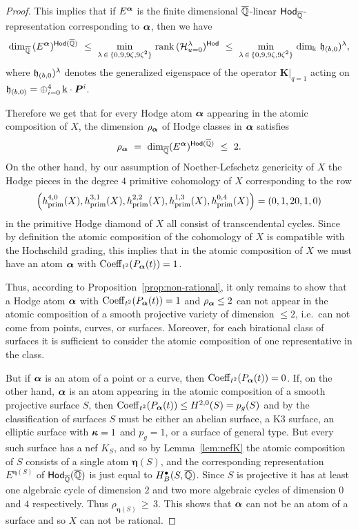 \documentclass[twoside,leqno]{article}
\numberwithin{equation}{section}
\theoremstyle{plain}
\theoremstyle{definition}
\begin{document}
\begin{proof}
This implies that if $E^{\boldsymbol{\alpha}}$ is the finite dimensional $\overline{\mathbb Q}$-linear $\mathsf{Hod}_{\overline{\mathbb Q}}$-representation 
corresponding to $\boldsymbol{\alpha}$, then we have
\[
\dim_{\overline{\mathbb Q}} \, (E^{\boldsymbol{\alpha}})^{\mathsf{Hod}(\overline{\mathbb Q})} \ \leq \ \min_{\substack{\lambda \, \in \, \{0,9,9\zeta,9\zeta^2\}}} \, \operatorname{rank} \, (\mathcal H^{\lambda}_{u=0})^{\mathsf{Hod}} \ \leq \  \min_{\substack{\lambda \, \in \, \{0,9,9\zeta,9\zeta^2\}}} \,  
\dim_{\Bbbk} \,  \mathfrak{h}_{(b,0})^{\lambda},
\]
where $\mathfrak{h}_{(b,0})^{\lambda}$ denotes the generalized eigenspace of the operator $\mathbf{K}|_{q=1}$ acting on $\mathfrak{h}_{(b,0)} = \oplus_{i = 0}^4 \, \Bbbk\cdot \boldsymbol{P}^{i}$.

Therefore we get that for 
every Hodge atom $\boldsymbol{\alpha}$ appearing in the atomic composition of $X$, the dimension $\rho_{\boldsymbol{\alpha}}$ of Hodge classes in $\boldsymbol{\alpha}$ satisfies 
\[
\rho_{\boldsymbol{\alpha}} \ = \ \dim_{\overline{\mathbb Q}} (E^{\boldsymbol{\alpha}})^{\mathsf{Hod}(\overline{\mathbb Q})} \ \leq  \ 2.
\]
On the other hand, by our  assumption of Noether-Lefschetz genericity of $X$ the Hodge pieces  in the degree $4$ primitive cohomology of $X$ corresponding to the row 
\[
\left(h^{4,0}_{\operatorname{prim}}(X),h^{3,1}_{\operatorname{prim}}(X), h^{2,2}_{\operatorname{prim}}(X),h^{1,3}_{\operatorname{prim}}(X),h^{0,4}_{\operatorname{prim}}(X)\right) = (0,1, 20, 1,0)
\]
in the primitive Hodge diamond of $X$ all  consist of transcendental cycles. Since by definition the atomic composition of the cohomology of $X$ is compatible with the Hochschild grading, this implies that in 
the atomic composition of $X$ we must have an atom $\boldsymbol{\alpha}$ with $\operatorname{Coeff}_{t^2}(P_{\boldsymbol{\alpha}}(t)) = 1$. 

Thus, according to Proposition~\ref{prop:non-rational}, it only remains to show that a Hodge atom $\boldsymbol{\alpha}$ with $\operatorname{Coeff}_{t^2}(P_{\boldsymbol{\alpha}}(t)) = 1$ and $\rho_{\boldsymbol{\alpha}} \leq 2$ can not appear in the atomic composition of a smooth projective variety of dimension $\leq 2$, i.e.\ can not come from points, curves, or surfaces.
Moreover, for each birational class of surfaces it is sufficient to consider the atomic composition of one representative in the class.


But if $\boldsymbol{\alpha}$ is an atom of a point or a curve, then $\operatorname{Coeff}_{t^2}(P_{\boldsymbol{\alpha}}(t)) = 0$. If, on the other hand, $\boldsymbol{\alpha}$ is an atom appearing in the atomic composition of a smooth projective surface $S$, then $\operatorname{Coeff}_{t^2}(P_{\boldsymbol{\alpha}}(t)) \leq  H^{2,0}(S) = p_{g}(S)$ and by the classification of surfaces  
$S$ must be either an abelian surface, a K3 surface, an elliptic surface with $\boldsymbol{\kappa} =1$ and $p_{g} =1$, or a surface of general type. But every such surface has a nef $K_{S}$, and so by Lemma~\ref{lem:nefK} the atomic composition of $S$ consists of a single atom $\boldsymbol{\eta}(S)$, and the corresponding representation 
$E^{\boldsymbol{\eta}(S)}$ of $\mathsf{Hod}_{\overline{\mathbb Q}}(\overline{\mathbb Q})$ is just equal to 
$H^{\bullet}_{B}(S,\overline{\mathbb Q})$. Since $S$ is projective it has at least one algebraic cycle of dimension $2$ and two more algebraic cycles of dimension $0$ and $4$ respectively.
Thus $\rho_{\boldsymbol{\eta}(S)} \, \geq \, 3$. This shows that $\boldsymbol{\alpha}$ can not be an atom of a surface and so $X$ can not be rational.
\end{proof}
\end{document}
